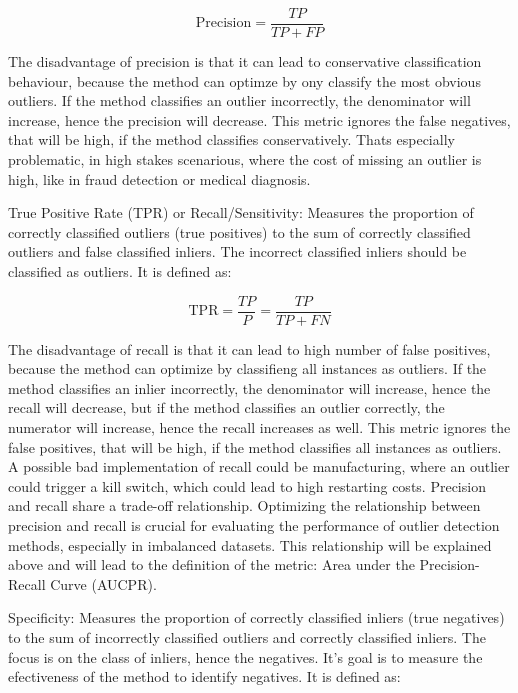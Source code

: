     \begin{equation}
        \text{Precision} = \frac{TP}{TP + FP}
    \end{equation}

    The disadvantage of precision is that it can lead to conservative classification behaviour, because the method can optimze by ony classify the most obvious outliers.
    If the method classifies an outlier incorrectly, the denominator will increase, hence the precision will decrease. 
    This metric ignores the false negatives, that will be high, if the method classifies conservatively.
    Thats especially problematic, in high stakes scenarious, where the cost of missing an outlier is high, like in fraud detection or medical diagnosis.

    \item True Positive Rate (TPR) or Recall/Sensitivity: Measures the proportion of correctly classified outliers (true positives) to the sum of correctly classified outliers and false classified inliers.
    The incorrect classified inliers should be classified as outliers.
    It is defined as: 

    \begin{equation}
        \text{TPR} = \frac{TP}{P} = \frac{TP}{TP + FN}
    \end{equation}

    The disadvantage of recall is that it can lead to high number of false positives, because the method can optimize by classifieng all instances as outliers.
    If the method classifies an inlier incorrectly, the denominator will increase, hence the recall will decrease, but if the method classifies an outlier correctly, the numerator will increase, hence the recall increases as well.
    This metric ignores the false positives, that will be high, if the method classifies all instances as outliers.
    A possible bad implementation of recall could be manufacturing, where an outlier could trigger a kill switch, which could lead to high restarting costs.
    Precision and recall share a trade-off relationship. 
    Optimizing the relationship between precision and recall is crucial for evaluating the performance of outlier detection methods, especially in imbalanced datasets.
    This relationship will be explained above and will lead to the definition of the metric: Area under the Precision-Recall Curve (AUCPR).

    \item Specificity: Measures the proportion of correctly classified inliers (true negatives) to the sum of incorrectly classified outliers and correctly classified inliers.
    The focus is on the class of inliers, hence the negatives.
    It's goal is to measure the efectiveness of the method to identify negatives.
    It is defined as:

